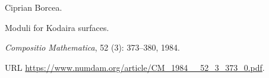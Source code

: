 Ciprian Borcea.

\newblock Moduli for {Kodaira} surfaces.

\newblock \emph{Compositio Mathematica}, 52 (3): 373--380,
  1984.

\newblock URL \url{https://www.numdam.org/article/CM_1984__52_3_373_0.pdf}.


